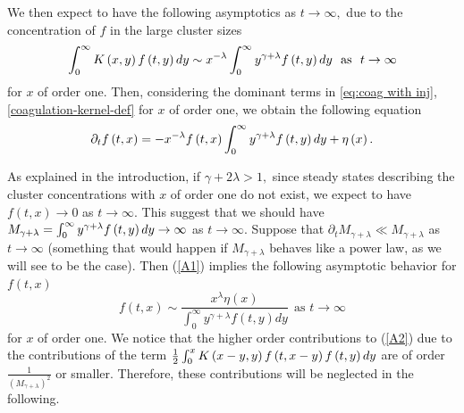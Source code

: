 \documentclass[11pt]{article}
\numberwithin{equation}{section}
\theoremstyle{plain}
\newcommand{\der}{\textup{d}}
\begin{document}
We then expect to have the following asymptotics as $t\rightarrow\infty,$ due
to the concentration of $f$ in the large cluster sizes%
\[
\int_{0}^{\infty}K\left(  x,y\right)  f\left(  t,y\right)  \der y\sim x^{-\lambda
}\int_{0}^{\infty}y^{\gamma+\lambda}f\left(  t,y\right)  \der y\ \ \text{as\ \ }%
t\rightarrow\infty
\]
for $x$ of order one.
Then, considering the dominant terms in \eqref{eq:coag with inj}, \eqref{coagulation-kernel-def} for $x$ of order one, we obtain the following equation%
\begin{equation}
\partial_{t}f\left(  t,x\right)  =-x^{-\lambda}f\left(  t,x\right)  \int
_{0}^{\infty}y^{\gamma+\lambda}f\left(  t,y\right)  \der y+\eta\left(  x\right).
\label{A1}%
\end{equation}

As explained in the introduction, if $\gamma+2\lambda> 1,$ 
since steady
states describing the cluster concentrations with $x$ of order one do not exist, we expect
to have $f\left(  t,x\right)  \rightarrow0$ as $t\rightarrow\infty.$ This
suggest that we should have $M_{\gamma+\lambda}=\int_{0}^{\infty}%
y^{\gamma+\lambda}f\left(  t,y\right)  \der y\rightarrow\infty$ as $t\rightarrow
\infty.$ Suppose that $\partial_{t}M_{\gamma+\lambda}\ll M_{\gamma+\lambda}$
as $t\rightarrow\infty$ (something that would happen if $M_{\gamma+\lambda}$
behaves like a power law, as we will see to be the case). Then (\ref{A1})
implies the following asymptotic behavior for $f\left(  t,x\right)  $%
\begin{equation}
f\left(  t,x\right)  \sim\frac{x^{\lambda}\eta\left(  x\right)  }{\int
_{0}^{\infty}y^{\gamma+\lambda}f\left(  t,y\right)  dy}\ \ \text{as\ \ }%
t\rightarrow\infty\label{A2}%
\end{equation}
for $x$ of order one. We notice that the higher order contributions to
(\ref{A2}) due to the contributions of the term $\frac{1}{2}\int_{0}%
^{x}K\left(  x-y,y\right)  f\left(  t,x-y\right)  f\left(  t,y\right)  \der y$ are
of order $\frac{1}{ \left( M_{\gamma+\lambda}\right)^{2}}$ or smaller.
Therefore, these contributions will be neglected in the following.
\end{document}
